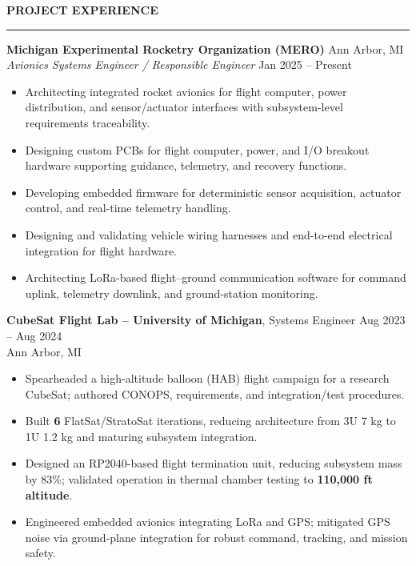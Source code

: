 \documentclass[10pt]{article}
\newcommand{\ressection}[1]{
  \vspace{0.25em}
  {\large\bfseries #1}\par
  \vspace{0.08em}\hrule\vspace{0.20em}
}
\begin{document}
\ressection{PROJECT EXPERIENCE}

\textbf{Michigan Experimental Rocketry Organization (MERO)} \hfill Ann Arbor, MI \\
\textit{Avionics Systems Engineer / Responsible Engineer} \hfill Jan 2025 – Present

\begin{itemize}
\item Architecting integrated rocket avionics for flight computer, power distribution, and sensor/actuator interfaces with subsystem-level requirements traceability.
\item Designing custom PCBs for flight computer, power, and I/O breakout hardware supporting guidance, telemetry, and recovery functions.
\item Developing embedded firmware for deterministic sensor acquisition, actuator control, and real-time telemetry handling.
\item Designing and validating vehicle wiring harnesses and end-to-end electrical integration for flight hardware.
\item Architecting LoRa-based flight--ground communication software for command uplink, telemetry downlink, and ground-station monitoring.
\end{itemize}

{\bfseries CubeSat Flight Lab -- University of Michigan}, Systems Engineer \hfill Aug 2023 -- Aug 2024 \\
Ann Arbor, MI
\begin{itemize}
  \item Spearheaded a high-altitude balloon (HAB) flight campaign for a research CubeSat; authored CONOPS, requirements, and integration/test procedures.
  \item Built {\bfseries 6} FlatSat/StratoSat iterations, reducing architecture from 3U 7 kg to 1U 1.2 kg and maturing subsystem integration.
  \item Designed an RP2040-based flight termination unit, reducing subsystem mass by 83\%; validated operation in thermal chamber testing to {\bfseries 110,000 ft altitude}.
  \item Engineered embedded avionics integrating LoRa and GPS; mitigated GPS noise via ground-plane integration for robust command, tracking, and mission safety.
\end{itemize}
\end{document}
